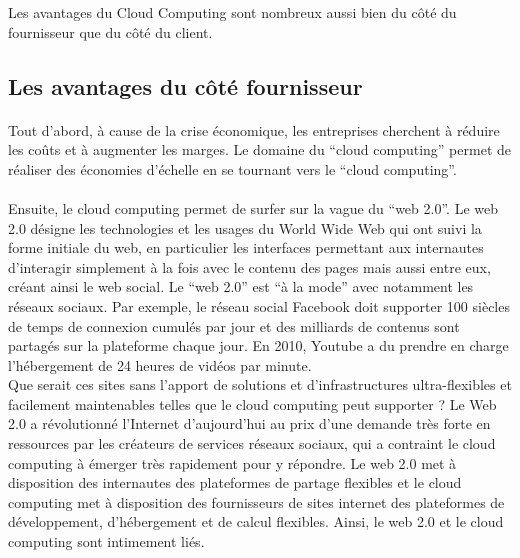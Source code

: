 \documentclass[a4paper,12pt]{report}
\begin{document}
\begin{onehalfspace}
	Les avantages du Cloud Computing sont nombreux aussi bien du côté du fournisseur que du côté du client.
	
	\subsection{Les avantages du côté fournisseur}
	
	\paragraph*{}
	Tout d’abord, à cause de la crise économique, les entreprises cherchent à réduire les coûts et à augmenter les marges. Le domaine du “cloud computing” permet de réaliser des économies d’échelle en se tournant vers le “cloud computing”.

	\paragraph*{}
	Ensuite, le cloud computing permet de surfer sur la vague du “web 2.0”. Le web 2.0 désigne les technologies et les usages du World Wide Web qui ont suivi la forme initiale du web, en particulier les interfaces permettant aux internautes d'interagir simplement à la fois avec le contenu des pages mais aussi entre eux, créant ainsi le web social. Le “web 2.0” est “à la mode” avec notamment les réseaux sociaux. Par exemple, le réseau social Facebook doit supporter 100 siècles de temps de connexion cumulés par jour et des milliards de contenus sont partagés sur la plateforme chaque jour. En 2010, Youtube a du prendre en charge l’hébergement de 24 heures de vidéos par minute.\\
Que serait ces sites sans l’apport de solutions et d’infrastructures ultra-flexibles et facilement maintenables telles que le cloud computing peut supporter ? Le Web 2.0 a révolutionné l’Internet d’aujourd’hui au prix d’une demande très forte en ressources par les créateurs de services réseaux sociaux, qui a contraint le cloud computing à émerger très rapidement pour y répondre. Le web 2.0 met à disposition des internautes des plateformes de partage flexibles et le cloud computing met à disposition des fournisseurs de sites internet des plateformes de développement, d’hébergement et de calcul flexibles. Ainsi, le web 2.0 et le cloud computing sont intimement liés.
	

\end{onehalfspace}
\end{document}
